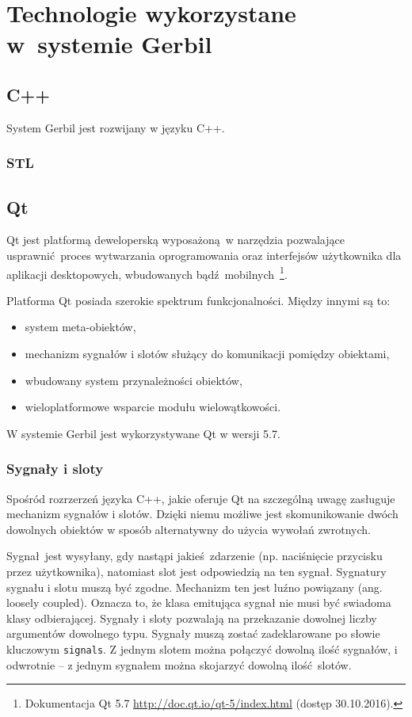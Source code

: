 \chapter{Technologie wykorzystane w~systemie Gerbil}

 \section{C++}
System Gerbil jest rozwijany w języku C++. 

 \subsection{STL}

 \section{Qt}

Qt jest platformą deweloperską wyposażoną w narzędzia pozwalające usprawnić proces wytwarzania oprogramowania oraz interfejsów użytkownika dla aplikacji desktopowych, wbudowanych bądź mobilnych~\footnote{Dokumentacja Qt 5.7 \url{http://doc.qt.io/qt-5/index.html} (dostęp 30.10.2016).}.

Platforma Qt posiada szerokie spektrum funkcjonalności. Między innymi są to:
\begin{itemize}
	\item system meta-obiektów,
	\item mechanizm sygnałów i slotów służący do komunikacji pomiędzy obiektami,
	\item wbudowany system przynależności obiektów,
	\item wieloplatformowe wsparcie modułu wielowątkowości.
		
\end{itemize}

W systemie Gerbil jest wykorzystywane Qt w wersji 5.7.

  \subsection{Sygnały i sloty}

Spośród rozrzerzeń języka C++, jakie oferuje Qt na szczególną uwagę zasługuje mechanizm sygnałów i slotów. Dzięki niemu możliwe jest skomunikowanie dwóch dowolnych obiektów w sposób alternatywny do użycia wywołań zwrotnych. 

Sygnał jest wysyłany, gdy nastąpi jakieś zdarzenie (np. naciśnięcie przycisku przez użytkownika), natomiast slot jest odpowiedzią na ten sygnał. Sygnatury sygnału i slotu muszą być zgodne. Mechanizm ten jest luźno powiązany (ang. loosely coupled). Oznacza to, że klasa emitująca sygnał nie musi być swiadoma klasy odbierającej. Sygnały i sloty pozwalają na przekazanie dowolnej liczby argumentów dowolnego typu. Sygnały muszą zostać zadeklarowane po słowie kluczowym \lstinline$signals$. Z jednym slotem można połączyć dowolną ilość sygnałów, i odwrotnie -- z jednym sygnałem można skojarzyć dowolną ilość slotów.

